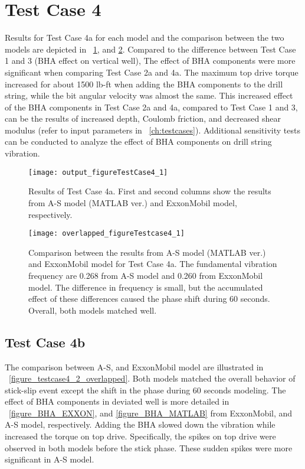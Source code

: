 \section{Test Case 4}
Results for Test Case 4a for each model and the comparison between the two models are depicted in \figurename~\ref{figure_testcase4_1}, and \ref{figure_testCase4_1_overlapped}. Compared to the difference between Test Case 1 and 3 (BHA effect on vertical well), The effect of BHA components were more significant when comparing Test Case 2a and 4a. The maximum top drive torque increased for about 1500 lb-ft when adding the BHA components to the drill string, while the bit angular velocity was almost the same. This increased effect of the BHA components in Test Case 2a and 4a, compared to Test Case 1 and 3, can be the results of increased depth, Coulomb friction, and decreased shear modulus (refer to input parameters in \chaptername~\ref{ch:testcases}). Additional sensitivity tests can be conducted to analyze the effect of BHA components on drill string vibration.

\begin{figure}
  \centering
  \texttt{[image: output\_figureTestCase4\_1]}
  \caption[Results of Test Case 4a]{Results of Test Case 4a. First and second columns show the results from A-S model (MATLAB ver.) and ExxonMobil model, respectively.}\label{figure_testcase4_1}
\end{figure}

\begin{figure}
  \centering
  \texttt{[image: overlapped\_figureTestcase4\_1]}
  \caption[Comparison of the results for Test Case 4a]{Comparison between the results from A-S model (MATLAB ver.) and ExxonMobil model for Test Case 4a. The fundamental vibration frequency are 0.268 from A-S model and 0.260 from ExxonMobil model. The difference in frequency is small, but the accumulated effect of these differences caused the phase shift during 60 seconds. Overall, both models matched well.}\label{figure_testCase4_1_overlapped}
\end{figure}


\subsection{Test Case 4b}
The comparison between A-S, and ExxonMobil model are illustrated in \figurename~\ref{figure_testcase4_2_overlapped}. Both models matched the overall behavior of stick-slip event except the shift in the phase during 60 seconds modeling. The effect of BHA components in deviated well is more detailed in \figurename~\ref{figure_BHA_EXXON}, and \ref{figure_BHA_MATLAB} from ExxonMobil, and A-S model, respectively. Adding the BHA slowed down the vibration while increased the torque on top drive. Specifically, the spikes on top drive were observed in both models before the stick phase. These sudden spikes were more significant in A-S model.


